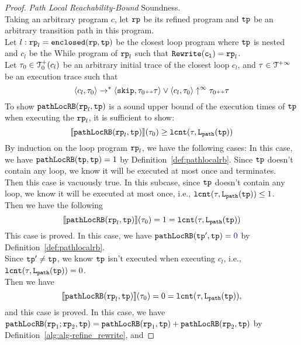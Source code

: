 \begin{proof}
\emph{Path Local Reachability-Bound} Soundness.
\\
Taking an arbitrary program $c$, let $\mathtt{rp}$ be its refined program and $\mathtt{tp}$ be an arbitrary transition path in this program.
\\
Let $l: \mathtt{rp}_l = \mathtt{enclosed}(\mathtt{rp}, \mathtt{tp})$ be the closest loop program where $\mathtt{tp}$ is nested and $c_l$ be the While program of $\mathtt{rp}_l$ such that $\mathtt{Rewrite(c_l)} = \mathtt{rp}_l$. 
\\
Let $\mathtt{\tau}_0 \in \mathcal{T}^{+}_0(c_l)$ be an arbitrary initial trace of the closest loop $c_l$, and $\mathtt{\tau} \in \mathcal{T}^{+\infty} $ be an execution trace such that
\[
  \langle c_l, \mathtt{\tau}_0 \rangle \to^* \langle \mathtt{skip}, \mathtt{\tau}_0 {\scriptscriptstyle ++} \mathtt{\tau} \rangle \lor \langle c_l, \mathtt{\tau}_0 \rangle \uparrow^{\infty} \mathtt{\tau}_0 {\scriptscriptstyle ++} \mathtt{\tau} 
\]
To show $\mathtt{pathLocRB}(\mathtt{rp}_l, \mathtt{tp})$ is a sound upper bound of the execution times of $\mathtt{tp}$ when executing the $\mathtt{rp}_l$, it is sufficient to show:
\[
  \llbracket \mathtt{pathLocRB}(\mathtt{rp}_l, \mathtt{tp}) \rrbracket(\mathtt{\tau}_0) \geq \mathtt{lcnt}(\mathtt{\tau}, \mathtt{L}_{\mathtt{path}}(\mathtt{tp}))
\]
By induction on the loop program $\mathtt{rp}_l$,
we have the following cases:
In this case, we have $\mathtt{pathLocRB}(\mathtt{tp}, \mathtt{tp}) = 1$ by Definition~\ref{def:pathlocalrb}. 
Since $\mathtt{tp}$ doesn't contain any loop, we know it will be executed at most once and terminates.
\\
Then this case is vacuously true.
In this subcase, since $\mathtt{tp}$ doesn't contain any loop, we know it will be executed at most once,  i.e., $\mathtt{lcnt}(\mathtt{\tau}, \mathtt{L}_{\mathtt{path}}(\mathtt{tp})) \leq 1$.
\\
Then we have the following
\[\llbracket \mathtt{pathLocRB}(\mathtt{rp}_l, \mathtt{tp}) \rrbracket(\mathtt{\tau}_0) = 1 = \mathtt{lcnt}(\mathtt{\tau}, \mathtt{L}_{\mathtt{path}}(\mathtt{tp})) \]
This case is proved.
In this case, we have $\outinB(\tpath', \tpath) = \highlight{0} $ by Definition~\ref{def:pathlocalrb}.
\\
Since $\mathtt{tp}' \neq \mathtt{tp}$, we know $\mathtt{tp}$ isn't executed when executing $c_l$, i.e., $\mathtt{lcnt}(\mathtt{\tau}, \mathtt{L}_{\mathtt{path}}(\mathtt{tp})) = 0$.
\\
Then we have
\[
  \llbracket \mathtt{pathLocRB}(\mathtt{rp}_l, \mathtt{tp}) \rrbracket(\mathtt{\tau}_0) = 0 = \mathtt{lcnt}(\mathtt{\tau}, \mathtt{L}_{\mathtt{path}}(\mathtt{tp})),
  \]
and this case is proved.
In this case, we have $\mathtt{pathLocRB}(\mathtt{rp}_1;\mathtt{rp}_2, \mathtt{tp}) = \mathtt{pathLocRB}(\mathtt{rp}_1, \mathtt{tp}) + \mathtt{pathLocRB}(\mathtt{rp}_2, \mathtt{tp}) $ by Definition~\ref{alg:alg-refine_rewrite}, and

\end{proof}
